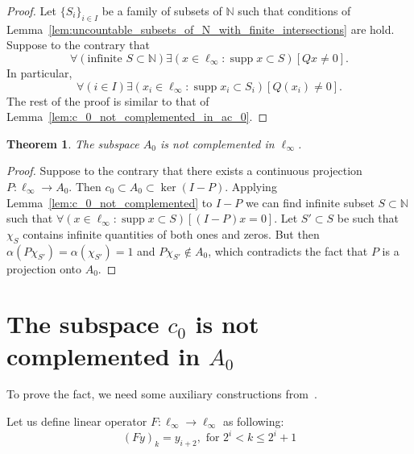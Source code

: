 \documentclass[a4paper,10pt]{article} %
\DeclareMathOperator{\supp}{supp}
\theoremstyle{plain}
\newtheorem{theorem}{Theorem}[section]
\theoremstyle{definition}
\begin{document}
\begin{proof}
	Let $\{S_i\}_{i \in I}$ be a family of subsets of $\mathbb{N}$
	such that conditions of Lemma~\ref{lem:uncountable_subsets_of_N_with_finite_intersections} are hold.
	Suppose to the contrary that
	\begin{equation}
		\forall(\mbox{infinite }S\subset\mathbb{N})\exists(x \in \ell_\infty : \supp x \subset S)[Qx \neq 0]
		.
	\end{equation}
	In particular,
	\begin{equation}
		\forall(i\in I)\exists(x_i \in \ell_\infty : \supp x_i \subset S_i)[Q(x_i) \neq 0]
		.
	\end{equation}
	The rest of the proof is similar to that of Lemma~\ref{lem:c_0_not_complemented_in_ac_0}.
\end{proof}





\begin{theorem}
	The subspace $A_0$ is not complemented in $\ell_\infty$.
\end{theorem}

\begin{proof}
	Suppose to the contrary that
	there exists a continuous projection $P: \ell_\infty \to A_0$.
	Then $c_0\subset A_0\subset\ker (I-P)$.
	Applying Lemma~\ref{lem:c_0_not_complemented} to $I-P$
	we can find infinite subset $S\subset\mathbb{N}$
	such that $\forall(x\in\ell_\infty : \supp x \subset S)[(I-P)x = 0]$.
	Let $S' \subset S$ be such that $\chi_S$ contains
	infinite quantities of both ones and zeros.
	But then $\alpha(P\chi_{S'}) = \alpha(\chi_{S'}) = 1$ and $P\chi_{S'} \notin A_0$,
	which contradicts the fact  that $P$ is a projection onto $A_0$.
\end{proof}



\section{The subspace $c_0$ is not complemented in $A_0$}
\label{sec:c0_in_A0}

To prove the fact, we need some auxiliary constructions from~\cite{our-vzms-2018}.


Let us define linear operator $F:\ell_\infty \to \ell_\infty$ as following:
\begin{equation}
	\label{operator_F}
	(Fy)_k = y_{i+2}, \mbox{ for } 2^i < k \leq 2^i+1
\end{equation}
\end{document}
